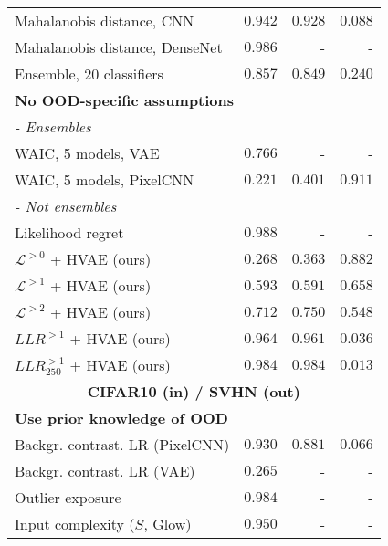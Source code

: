 \begin{table}[t!]
{\begin{tabular}{lrrr}
Mahalanobis distance, CNN {\cite{ren_likelihood_2019}}                     & $0.942$ & $0.928$ & $0.088$ \\
Mahalanobis distance, DenseNet {\cite{lee_simple_2018}}                & $0.986$ & - & - \\
Ensemble, 20 classiﬁers {\cite{ren_likelihood_2019, lakshminarayanan_simple_2017}}                  & $0.857$ & $0.849$ & $0.240$ \\
         \multicolumn{4}{l}{\textbf{No OOD-specific assumptions}} \\
         \multicolumn{4}{l}{\textit{- Ensembles}} \\
WAIC, 5 models, VAE {\cite{choi_waic_2019}}                          & $0.766$ & - & - \\
WAIC, 5 models, PixelCNN {\cite{ren_likelihood_2019}}                      & $0.221$ & $0.401$ & $0.911$ \\
        \multicolumn{4}{l}{\textit{- Not ensembles}} \\
Likelihood regret \cite{xiao_likelihood_2020}                               & $\mathbf{0.988}$ & - & - \\
$\mathcal{L}^{>0}$ + HVAE (ours)                    & $0.268$ & $0.363$ & $0.882$ \\
$\mathcal{L}^{>1}$ + HVAE (ours)                    & $0.593$ & $0.591$ & $0.658$ \\
$\mathcal{L}^{>2}$ + HVAE (ours)                    & $0.712$ & $0.750$ & $0.548$ \\
$LLR^{>1}$ + HVAE (ours)                            & $0.964$ & $0.961$ & $0.036$ \\
$LLR^{>1}_{250}$ + HVAE (ours)                      & $0.984$ & $\mathbf{0.984}$ & $\mathbf{0.013}$ \\
         \midrule
         \multicolumn{4}{c}{\textbf{CIFAR10 (in) / SVHN (out)}} \\
         \midrule
         \multicolumn{4}{l}{\textbf{Use prior knowledge of OOD}} \\
Backgr. contrast. LR (PixelCNN) {\cite{ren_likelihood_2019}}               & $0.930$ & $0.881$ & $0.066$ \\
Backgr. contrast. LR (VAE) {\cite{xiao_likelihood_2020}}                    & $0.265$ & - & - \\
Outlier exposure {\cite{hendrycks_deep_2019}}                              & $0.984$ & - & - \\
Input complexity ($S$, Glow) \cite{serra_input_2020}                   & $0.950$ & - & - \\

\end{tabular}}
\end{table}
